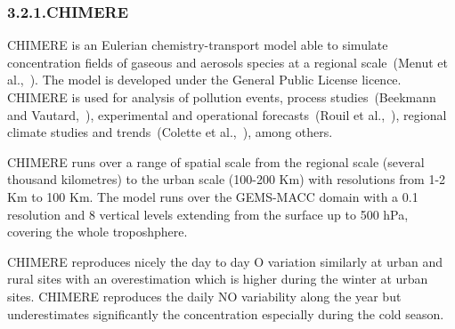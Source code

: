 \documentclass[9pt]{report}
\begin{document}
\begin{table}[h!]
\begin{mdbmarginx}{}{}{}{}
\begin{mdcenter}
{{%
\mdhr{}%

\noindent{}%
}}%
\end{mdcenter}\label{models-2}%
\end{mdbmarginx}%
\end{table}%

\subsubsection{3.2.1.\hspace*{0.5em}CHIMERE}\label{sec-chimere}%

\noindent{}CHIMERE is an Eulerian chemistry-transport model able to simulate concentration ﬁelds of gaseous and aerosols species at a regional scale~(Menut et al.,~). 
The model is developed under the General Public License licence. CHIMERE is used for analysis of pollution events, process studies~(Beekmann and Vautard,~), experimental and operational forecasts~(Rouil et al.,~), regional climate studies and trends~(Colette et al.,~), among others.%

CHIMERE runs over a range of spatial scale from the regional scale (several thousand kilometres) to the urban scale (100-200 Km) with resolutions from 1-2 Km to 100 Km. 
The model runs over the GEMS-MACC domain with a 0.1\textdegree{} resolution and 8 vertical levels extending from the surface up to 500 hPa, covering the whole troposhphere.%

CHIMERE reproduces nicely the day to day O variation similarly at urban and rural sites with an overestimation which is higher during the winter at urban sites. 
CHIMERE reproduces the daily NO variability along the year but underestimates significantly the concentration especially during the cold season.%
\end{document}

